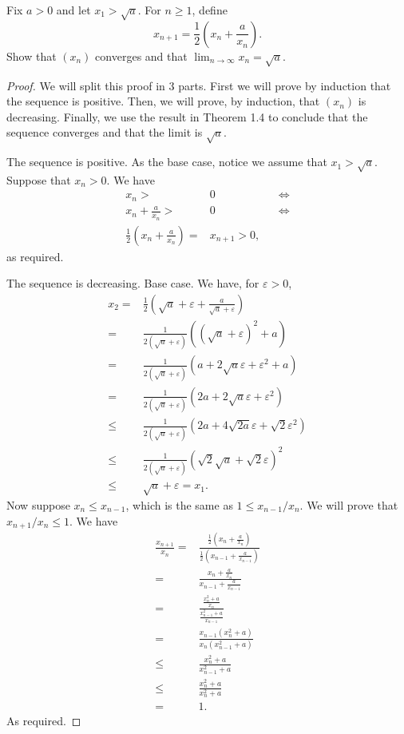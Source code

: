 \begin{exercise}{11}
Fix $a>0$ and let $x_1>\sqrt{a}$. For $n\geq 1$, define 
\[x_{n+1}=\frac{1}{2}\left(x_n+\frac{a}{x_n}\right).\]
Show that $(x_n)$ converges and that $\lim_{n\to\infty}x_n=\sqrt{a}$.
\end{exercise}
\begin{proof}
We will split this proof in 3 parts. First we will prove by induction that the sequence is positive. Then, we will prove, by induction, that $(x_n)$ is decreasing. Finally, we use the result in Theorem 1.4 to conclude that the sequence converges and that the limit is $\sqrt{a}$.

The sequence is positive. As the base case, notice we assume that $x_1>\sqrt{a}$. Suppose that $x_n>0$. We have
\begin{align*}
    x_n >& 0 &&\iff\\
    x_n + \frac{a}{x_n} >& 0 &&\iff\\
    \frac{1}{2}\left(x_n + \frac{a}{x_n}\right) =& x_{n+1} > 0,
\end{align*}
as required.

The sequence is decreasing. Base case. We have, for $\varepsilon>0$,
\begin{align*}
    x_2 =& \frac{1}{2}\left(\sqrt{a}+\varepsilon+\frac{a}{\sqrt{a}+\varepsilon}\right)\\
    =& \frac{1}{2(\sqrt{a}+\varepsilon)}\left((\sqrt{a}+\varepsilon)^2+a\right)\\
    =& \frac{1}{2(\sqrt{a}+\varepsilon)}(a+2\sqrt{a}\varepsilon+\varepsilon^2+a)\\
    =& \frac{1}{2(\sqrt{a}+\varepsilon)}(2a+2\sqrt{a}\varepsilon+\varepsilon^2)\\
    \leq& \frac{1}{2(\sqrt{a}+\varepsilon)}(2a+4\sqrt{2a}\varepsilon+\sqrt{2}\varepsilon^2)\\
    \leq& \frac{1}{2(\sqrt{a}+\varepsilon)}(\sqrt{2}\sqrt{a}+\sqrt{2}\varepsilon)^2\\
    \leq& \sqrt{a}+\varepsilon= x_1.
\end{align*}
Now suppose $x_n\leq x_{n-1}$, which is the same as $1\leq x_{n-1}/x_n$. We will prove that $x_{n+1}/x_n\leq 1$. We have
\begin{align*}
    \frac{x_{n+1}}{x_n} =& \frac{\frac{1}{2}\left(x_n+\frac{a}{x_n}\right)}{\frac{1}{2}\left(x_{n-1}+\frac{a}{x_{n-1}}\right)}\\
    =& \frac{x_n+\frac{a}{x_n}}{x_{n-1}+\frac{a}{x_{n-1}}}\\
    =& \frac{\frac{x_n^2+a}{x_n}}{\frac{x_{n-1}^2+a}{x_{n-1}}}\\
    =& \frac{x_{n-1}(x_n^2+a)}{x_n(x_{n-1}^2+a)}\\
    \leq& \frac{x_n^2+a}{x_{n-1}^2+a}\\
    \leq& \frac{x_n^2+a}{x_n^2+a}\\
    =& 1.
\end{align*}
As required.


\end{proof}
